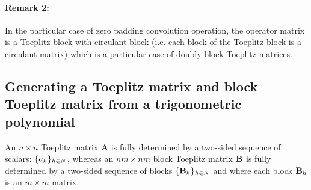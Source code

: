 \paragraph{Remark 2: } In the particular case of zero padding convolution operation, the operator matrix is a Toeplitz block with circulant block (i.e. each block of the Toeplitz block is a circulant matrix) which is a particular case of doubly-block Toeplitz matrices. 


\subsection{Generating a Toeplitz matrix and block Toeplitz matrix from a trigonometric polynomial}
An $n\times n$ Toeplitz matrix $\mathbf A$ is fully determined by a two-sided sequence of scalars: $\{a_h\}_{h \in N}$, whereas an $nm\times nm$ block Toeplitz matrix $\mathbf{B}$ is fully determined by a two-sided sequence of blocks $\{\mathbf{B}_h\}_{h \in N}$ and where each block $\mathbf{B}_h$ is an $m \times m$ matrix.  


